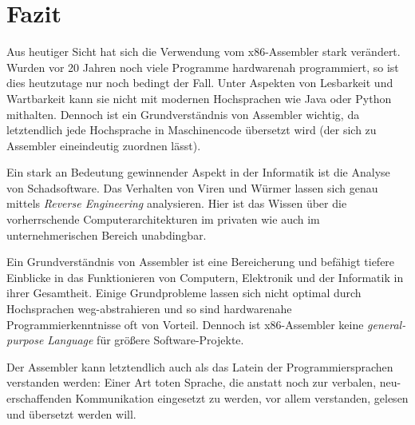 \section{Fazit}
Aus heutiger Sicht hat sich die Verwendung vom x86-Assembler stark verändert.
Wurden vor 20 Jahren noch viele Programme hardwarenah programmiert, so ist dies heutzutage nur noch bedingt der Fall.
Unter Aspekten von Lesbarkeit und Wartbarkeit kann sie nicht mit modernen Hochsprachen wie Java oder Python mithalten.
Dennoch ist ein Grundverständnis von Assembler wichtig, da letztendlich jede Hochsprache in Maschinencode übersetzt wird (der sich zu Assembler eineindeutig zuordnen lässt). 

Ein stark an Bedeutung gewinnender Aspekt in der Informatik ist die Analyse von Schadsoftware. Das Verhalten von Viren und Würmer lassen sich genau mittels \textit{Reverse Engineering} analysieren. Hier ist das Wissen über die vorherrschende Computerarchitekturen im privaten wie auch im unternehmerischen Bereich unabdingbar.

Ein Grundverständnis von Assembler ist eine Bereicherung und befähigt tiefere Einblicke in das Funktionieren von Computern, Elektronik und der Informatik in ihrer Gesamtheit. Einige Grundprobleme lassen sich nicht optimal durch Hochsprachen weg-abstrahieren und so sind hardwarenahe Programmierkenntnisse oft von Vorteil. Dennoch ist x86-Assembler keine \textit{general-purpose Language} für größere Software-Projekte.

Der Assembler kann letztendlich auch als das Latein der Programmiersprachen verstanden werden: Einer Art toten Sprache, die anstatt noch zur verbalen, neu-erschaffenden Kommunikation eingesetzt zu werden, vor allem verstanden, gelesen und übersetzt werden will.